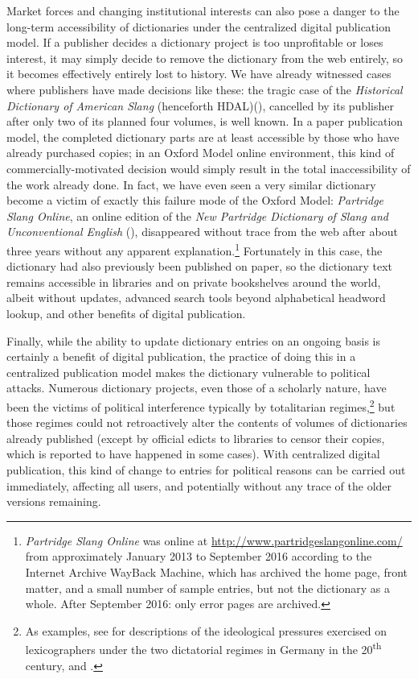 \documentclass[output=paper]{langscibook}
\begin{document}
Market forces and changing institutional interests can also pose a
danger to the long-term accessibility of dictionaries under the
centralized digital publication model. If a publisher decides a
dictionary project is too unprofitable or loses interest, it may simply
decide to remove the dictionary from the web entirely, so it becomes
effectively entirely lost to history. We have already witnessed cases
where publishers have made decisions like these: the tragic case of the
\emph{Historical Dictionary of American Slang} (henceforth HDAL)(\citealt{Lighter1994, Lighter1997}),
cancelled by its publisher after only two of its planned four volumes,
is well known. In a paper publication model, the completed dictionary
parts are at least accessible by those who have already purchased
copies; in an Oxford Model online environment, this kind of
commercially-motivated decision would simply result in the total
inaccessibility of the work already done. In fact, we have even seen a
very similar dictionary become a victim of exactly this failure mode of
the Oxford Model: \emph{Partridge Slang Online}, an online edition of
the \emph{New Partridge Dictionary of Slang and Unconventional English}
(\citealt{Dalzell2005}), disappeared without trace from the web after
about three years without any apparent explanation.\footnote{\emph{Partridge
  Slang Online} was online at
  \url{http://www.partridgeslangonline.com/} from approximately January
  2013 to September 2016  according to the Internet Archive WayBack
  Machine, which has archived the home page, front matter, and a small
  number of sample entries, but not the dictionary as a whole. After
  September 2016:  only error pages are archived.} Fortunately in this
case, the dictionary had also previously been published on paper, so the
dictionary text remains accessible in libraries and on private
bookshelves around the world, albeit without updates, advanced search
tools beyond alphabetical headword lookup, and other benefits of digital
publication.

Finally, while the ability to update dictionary entries on an ongoing
basis is certainly a benefit of digital publication, the practice of
doing this in a centralized publication model makes the dictionary
vulnerable to political attacks. Numerous dictionary projects, even
those of a scholarly nature, have been the victims of political
interference typically by totalitarian regimes,\footnote{As examples,
  see for descriptions of the ideological pressures exercised on
  lexicographers under the two dictatorial regimes in Germany in the
  20\textsuperscript{th} century, \citep{Lea2009} and \citep{Zielinski2010}.} but those regimes could
not retroactively alter the contents of volumes of dictionaries already
published (except by official edicts to libraries to censor their
copies, which is reported to have happened in some cases). With
centralized digital publication, this kind of change to entries for
political reasons can be carried out immediately, affecting all users,
and potentially without any trace of the older versions remaining.
\end{document}
